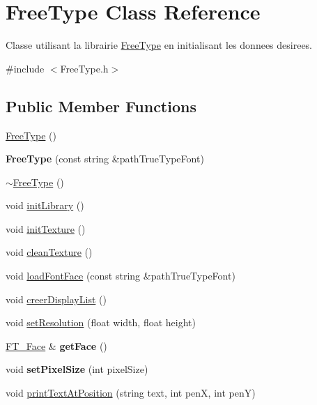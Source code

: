 \hypertarget{class_free_type}{\section{Free\-Type Class Reference}
\label{class_free_type}
}


Classe utilisant la librairie \hyperlink{class_free_type}{Free\-Type} en initialisant les donnees desirees.  




{\ttfamily \#include $<$Free\-Type.\-h$>$}

\subsection*{Public Member Functions}
\begin{DoxyCompactItemize}
\item 
\hyperlink{group__inf2990_ga34b3bbfa75ad14d4295b56c7ef8a062e}{Free\-Type} ()
\item 
\hypertarget{group__inf2990_ga831772b02c49313422af28959acece69}{{\bfseries Free\-Type} (const string \&path\-True\-Type\-Font)}\label{group__inf2990_ga831772b02c49313422af28959acece69}

\item 
\hyperlink{group__inf2990_gaf55027371f8f309f26c93c860f65a94f}{$\sim$\-Free\-Type} ()
\item 
void \hyperlink{group__inf2990_ga213041074b924b07fe30a4cb6d8d1362}{init\-Library} ()
\item 
void \hyperlink{group__inf2990_ga610876234c4188653e374e7c176570b7}{init\-Texture} ()
\item 
void \hyperlink{group__inf2990_ga4f70f3e9ce0d51870896a6230476eb2e}{clean\-Texture} ()
\item 
void \hyperlink{group__inf2990_ga354c5cac43c2c7432538adf1a79899dd}{load\-Font\-Face} (const string \&path\-True\-Type\-Font)
\item 
void \hyperlink{group__inf2990_ga317763d3c8ab552ebb0a183ccb3c5a20}{creer\-Display\-List} ()
\item 
void \hyperlink{group__inf2990_gaa73928ca8debab8694e93d15af80d4e0}{set\-Resolution} (float width, float height)
\item 
\hypertarget{group__inf2990_ga1be8daf6876bc99717c56e530a46c78e}{\hyperlink{struct_f_t___face_rec__}{F\-T\-\_\-\-Face} \& {\bfseries get\-Face} ()}\label{group__inf2990_ga1be8daf6876bc99717c56e530a46c78e}

\item 
\hypertarget{group__inf2990_gaaaf738786f093c7632778d5a46f9f8a0}{void {\bfseries set\-Pixel\-Size} (int pixel\-Size)}\label{group__inf2990_gaaaf738786f093c7632778d5a46f9f8a0}

\item 
void \hyperlink{group__inf2990_ga7e6477a694e033628531682432b9172c}{print\-Text\-At\-Position} (string text, int pen\-X, int pen\-Y)
\end{DoxyCompactItemize}


